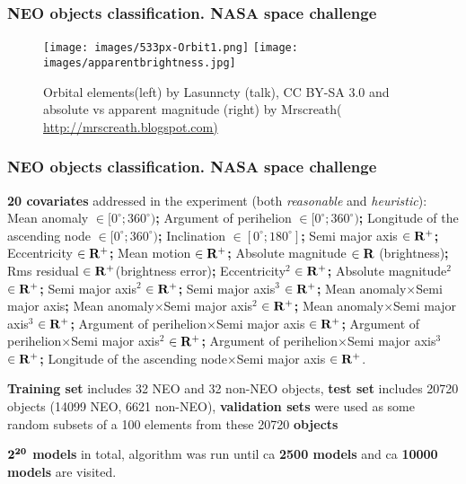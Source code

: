 \documentclass{beamer}
\begin{document}
\begin{frame}
\frametitle{NEO objects classification. NASA space challenge}

\begin{figure}
\texttt{[image: images/533px-Orbit1.png]}
\texttt{[image: images/apparentbrightness.jpg]}
\caption{Orbital elements(left) by Lasunncty (talk), CC BY-SA 3.0 and absolute vs apparent magnitude (right) by Mrscreath( \url{http://mrscreath.blogspot.com)} }
\end{figure}

\end{frame}
\begin{frame}
\frametitle{NEO objects classification. NASA space challenge}
\begin{flushleft}
\textbf{20 covariates} addressed in the experiment (both \textit{reasonable} and \textit{heuristic}): Mean anomaly $\in [0^{\circ};360^{\circ})$\textbf{;} Argument of perihelion $\in [0^{\circ};360^{\circ})$\textbf{;}  Longitude of the ascending node $\in [0^{\circ};360^{\circ})$\textbf{;} Inclination $\in [0^{\circ};180^{\circ}]$\textbf{;} Semi major axis  $\in \bold{R^+}$\textbf{;} Eccentricity $\in \bold{R^+}$\textbf{;} Mean motion  $\in \bold{R^+}$\textbf{;} Absolute magnitude  $\in \bold{R}$ (brightness)\textbf{;} Rms residual  $\in \bold{R^+}$(brightness error)\textbf{;} Eccentricity$^2$ $\in \bold{R^+}$\textbf{;} Absolute magnitude$^2$ $\in \bold{R^+}$\textbf{;} Semi major axis$^2$ $\in \bold{R^+}$\textbf{;} Semi major axis$^3$ $\in \bold{R^+}$\textbf{;} Mean anomaly$\times$Semi major axis\textbf{;}  Mean anomaly$\times$Semi major axis$^2$ $\in \bold{R^+}$\textbf{;} Mean anomaly$\times$Semi major axis$^3$ $\in \bold{R^+}$\textbf{;} Argument of perihelion$\times$Semi major axis $\in \bold{R^+}$\textbf{;}  Argument of perihelion$\times$Semi major axis$^2$ $\in \bold{R^+}$\textbf{;} Argument of perihelion$\times$Semi major axis$^3$ $\in \bold{R^+}$\textbf{;} Longitude of the ascending node$\times$Semi major axis $\in \bold{R^+}$.
\end{flushleft}
\begin{flushleft}
\textbf{Training set} includes 32 NEO and 32 non-NEO objects, \textbf{test set} includes 20720 objects (14099 NEO,  6621 non-NEO),  \textbf{validation sets} were used as some random subsets of a 100 elements from these  20720 \textbf{objects}
\begin{flushleft}
\textbf{$\bold{2^{20}}$ models} in total, algorithm was run until ca \textbf{2500 models} and ca \textbf{10000 models} are visited.
\end{flushleft}

\end{flushleft}

\end{frame}
\end{document}
